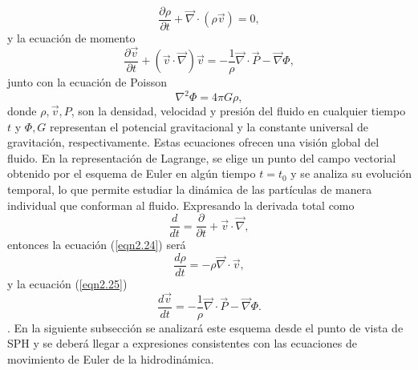 \documentclass[a4paper,openright,12pt]{book}
\begin{document}
\begin{equation}
 \frac{\partial\rho}{\partial t}
 +
 \vec{\nabla}\cdot(\rho\vec{v})
 = 0,\label{eqn2.24}
\end{equation}
y la ecuación de momento
\begin{equation}
 \frac{\partial\vec{v}}{\partial t}
 +
 (\vec{v}\cdot\vec{\nabla})\vec{v}
 =
 -\frac{1}{\rho} \vec{\nabla}\cdot\vec{P} - \vec{\nabla}\Phi,\label{eqn2.25}
\end{equation}
junto con la ecuación de Poisson
\begin{equation}
 \nabla^{2}\Phi = 4 \pi G \rho,\label{eqn2.26}
\end{equation}
donde $\rho, \vec{v}, P$, son la densidad, velocidad y presión del fluido en cualquier tiempo $t$ y $\Phi, G$ representan el potencial gravitacional y la constante universal de gravitación, respectivamente.
Estas ecuaciones ofrecen una visión global del fluido. En la representación de Lagrange, se elige un punto del campo vectorial obtenido por el esquema de Euler en algún tiempo $t = t_{0}$ y se analiza su evolución temporal, lo que permite estudiar la dinámica de las partículas de manera individual que conforman al fluido. Expresando la derivada total como
\begin{equation}
 \frac{d}{dt}
 =
 \frac{\partial }{\partial t} 
 +
 \vec{v}\cdot\vec{\nabla},\label{eqn2.27}
\end{equation}
entonces la ecuación (\ref{eqn2.24}) será
\begin{equation}
 \frac{d \rho}{d t}
 =
 - \rho \vec{\nabla}\cdot\vec{v},\label{eqn2.28}
\end{equation}
y la ecuación (\ref{eqn2.25})
\begin{equation}
 \frac{d \vec{v}}{d t} 
 =
 -\frac{1}{\rho}\vec{\nabla}\cdot\vec{P} - \vec{\nabla}\Phi.\label{eqn2.29}
\end{equation}.
En la siguiente subsección se analizará este esquema desde el punto de vista de SPH y se deberá llegar a expresiones consistentes con las ecuaciones de movimiento de Euler de la hidrodinámica.
\end{document}
